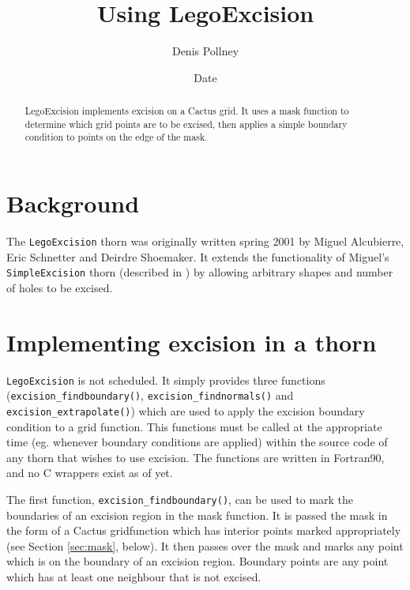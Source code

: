 \documentclass{article}
\begin{document}
\title{Using LegoExcision}
\author{Denis Pollney}
\date{$ $Date$ $}

\maketitle


\begin{abstract}
  LegoExcision implements excision on a Cactus grid. It uses a mask
  function to determine which grid points are to be excised, then
  applies a simple boundary condition to points on the edge of the
  mask.
\end{abstract}

\section{Background}

The \texttt{LegoExcision} thorn was originally written spring 2001 by
Miguel Alcubierre, Eric Schnetter and Deirdre Shoemaker. It extends
the functionality of Miguel's \texttt{SimpleExcision} thorn (described
in \cite{alcubierre-bruegmann:2001}) by allowing arbitrary shapes and
number of holes to be excised.

\section{Implementing excision in a thorn}

\texttt{LegoExcision} is not scheduled. It simply provides three
functions (\texttt{excision\_findboundary()},
\texttt{excision\_findnormals()} and 
\texttt{excision\_extrapolate()}) which are used to apply the excision
boundary condition to a grid function. This functions must be called at
the appropriate time (eg. whenever boundary conditions are applied)
within the source code of any thorn that wishes to use excision.
The functions are written in Fortran90, and no C wrappers exist as of
yet.

The first function, \texttt{excision\_findboundary()}, can be used to
mark the boundaries of an excision region in the mask function. It
is passed the mask in the form of a Cactus gridfunction which has
interior points marked appropriately (see Section \ref{sec:mask},
below). It then passes over the mask and marks any point which is on
the boundary of an excision region. Boundary points are any point
which has at least one neighbour that is not excised.
\\\vspace{\baselineskip}
\end{document}
